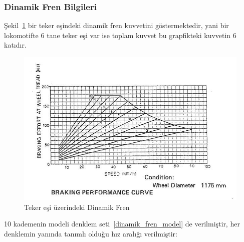 \documentclass[10pt,a4paper]{article}
\begin{document}
\subsubsection{Dinamik Fren Bilgileri}
Şekil~\ref{image:dinamik_fren} bir teker eşindeki dinamik fren kuvvetini göstermektedir, yani bir lokomotifte 6 tane teker eşi var ise toplam kuvvet bu grapfikteki kuvvetin 6 katıdır.

\begin{figure}[!h]
\shorthandoff{=}
\centering
\caption{Teker eşi üzerindeki Dinamik Fren }
\label{image:dinamik_fren}
\includegraphics[scale=0.7]{resimler/dinamik_fren.jpg} 
\end{figure}

10 kademenin modeli denklem seti~\ref{dinamik_fren_model} de verilmiştir, her denklemin yanında tanımlı olduğu hız aralığı verilmiştir:
\end{document}

